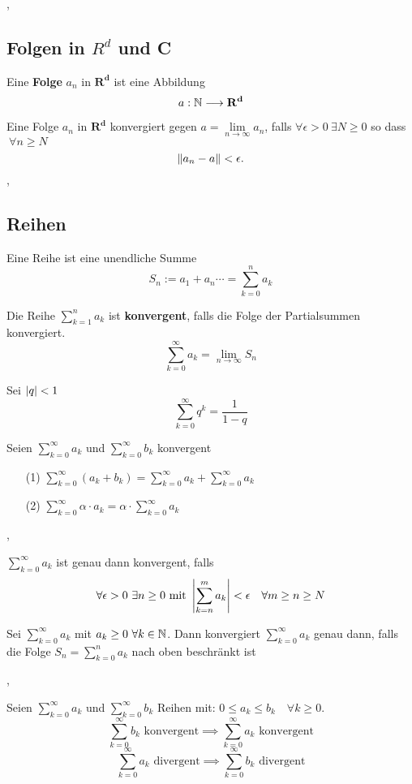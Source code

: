 \sep

\subsection{Folgen in $R^{d}$ und C}

\Def[2.6.1] Eine \textbf{Folge} $a_n$ in $\mathbf{R^{d}}$ ist eine Abbildung
\[
a: \mathbb{N}\longrightarrow \mathbf{R^{d}}
\] 

\Def[2.6.2] Eine Folge $a_n$ in $\mathbf{R^{d}}$ konvergiert gegen ${a = \lim\limits_{n \rightarrow \infty} a_{n}}$, falls $ \forall \epsilon > 0 \ \exists N \geq 0$ so dass $\ \forall n\geq N$
\[
 \left\lVert a_n-a \right\rVert < \epsilon.
\]
\sep

\subsection{Reihen}

\Def[2.7.0] Eine Reihe ist eine unendliche Summe
\[S_{n} := a_{1} + a_{n} \cdots = \sum_{k=0}^{n} a_{k}\]

\Def[2.7.1] Die Reihe $\sum_{k=1}^{n} a_{k}$ ist \textbf{konvergent}, falls die Folge der Partialsummen konvergiert. 
\[\sum_{k=0}^{\infty} a_{k} = \lim\limits_{n \rightarrow \infty} S_{n} \]

 Sei $\left\lvert q \right\rvert < 1$
\[\sum_{k=0}^{\infty} q^k = \frac{1}{1-q} \]

\Satz[2.7.4] Seien $\sum_{k=0}^{\infty} a_{k}$ und $\sum_{k=0}^{\infty} b_{k}$ konvergent
\begin{enumerate}
\item[(1)] $\sum_{k=0}^{\infty} (a_{k} + b_{k}) = \sum_{k=0}^{\infty} a_{k} + \sum_{k=0}^{\infty} a_{k}$ 
\item[(2)] $\sum_{k=0}^{\infty} \alpha \cdot a_{k} = \alpha \cdot \sum_{k=0}^{\infty} a_{k}$
\end{enumerate}

\sep

 $\sum_{k=0}^{\infty} a_{k}$ ist genau dann konvergent, falls
\[ \forall \epsilon > 0 \ \exists n \geq 0 \text{ mit } \left\lvert \sum_{k=n}^{m} a_{k} \right\rvert < \epsilon \quad \forall m \geq n \geq N\]

\Satz[2.7.6] Sei $\sum_{k=0}^{\infty} a_{k}$ mit $a_{k} \geq  0 \ \forall k \in \mathbb{N}$. Dann konvergiert
$\sum_{k=0}^{\infty} a_{k}$ genau dann, falls die Folge $S_{n} = \sum_{k=0}^{n} a_{k}$ nach oben beschränkt ist

\sep

\Korollar[2.7.7 (Vergleichssatz)] Seien $\sum_{k=0}^{\infty} a_{k}$ und $\sum_{k=0}^{\infty} b_{k}$ Reihen mit: $0 \leq a_{k} \leq b_{k} \quad \forall k \geq 0. $
\[ \sum_{k=0}^{\infty} b_{k} \text{ konvergent} \implies \sum_{k=0}^{\infty} a_{k} \text{ konvergent} \]
\[ \sum_{k=0}^{\infty} a_{k} \text{ divergent} \implies \sum_{k=0}^{\infty} b_{k} \text{ divergent} \]

